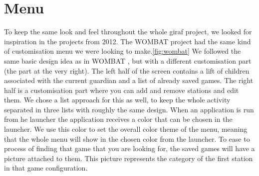 \section{Menu}
\label{designmenu}
To keep the same look and feel throughout the whole \ac{giraf} project, we looked for inspiration in the projects from 2012. The WOMBAT  project had the same kind of customisation menu we were looking to make.\autoref{fig:wombat} We followed the same basic design idea as in WOMBAT , but with a different customisation part (the part at the very right). The left half of the screen contains a lift of children associated with the current guardian and a list of already saved games. The right half is a customisation part where you can add and remove stations and edit them. We chose a list approach for this as well, to keep the whole activity separated in three lists with roughly the same design.
When an application is run from he launcher the application receives a color that can be chosen in the launcher. We use this color to set the overall color theme of the menu, meaning that the whole menu will show in the chosen color from the launcher.
To ease to process of finding that game that you are looking for, the saved games will have a picture attached to them. This picture represents the category of the first station in that game configuration.

